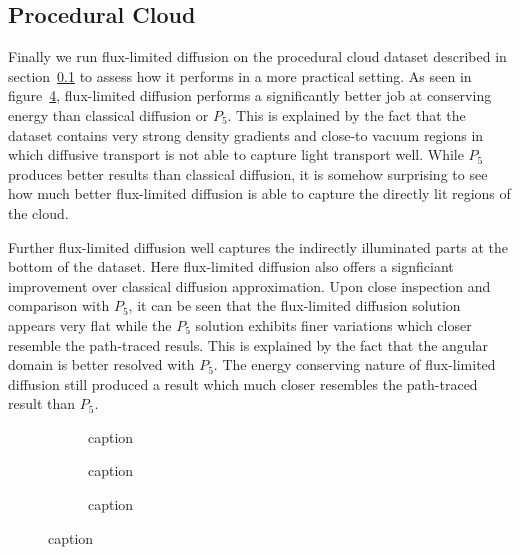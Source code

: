 \subsection{Procedural Cloud}
\label{sec:pn_results_clouds}

Finally we run flux-limited diffusion on the procedural cloud dataset described in section~\ref{sec:pn_results_clouds} to assess how it performs in a more practical setting. As seen in figure~\ref{fig:fld_results_nebulae}, flux-limited diffusion performs a significantly better job at conserving energy than classical diffusion or $P_5$. This is explained by the fact that the dataset contains very strong density gradients and close-to vacuum regions in which diffusive transport is not able to capture light transport well. While $P_5$ produces better results than classical diffusion, it is somehow surprising to see how much better flux-limited diffusion is able to capture the directly lit regions of the cloud.

Further flux-limited diffusion well captures the indirectly illuminated parts at the bottom of the dataset. Here flux-limited diffusion also offers a signficiant improvement over classical diffusion approximation. Upon close inspection and comparison with $P_5$, it can be seen that the flux-limited diffusion solution appears very flat while the $P_5$ solution exhibits finer variations which closer resemble the path-traced resuls. This is explained by the fact that the angular domain is better resolved with $P_5$. The energy conserving nature of flux-limited diffusion still produced a result which much closer resembles the path-traced result than $P_5$.

\begin{figure}[h]
\centering
\begin{subfigure}{0.31\columnwidth}
\caption{caption}
\label{fig:fld_results_nebulae_1}
\end{subfigure}
\hspace{0.01\columnwidth}
\begin{subfigure}{0.31\columnwidth}
\caption{caption}
\label{fig:fld_results_nebulae_2}
\end{subfigure}
\hspace{0.01\columnwidth}
\begin{subfigure}{0.31\columnwidth}
\caption{caption}
\label{fig:fld_results_nebulae_2}
\end{subfigure}%
\caption{caption}
\label{fig:fld_results_nebulae}
\end{figure}

